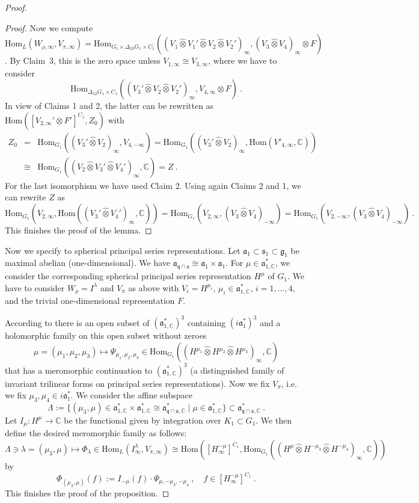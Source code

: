 \documentclass[10]{amsart}
\theoremstyle{remark}
\theoremstyle{definition}
\numberwithin{equation}{section}
\newcommand{\C}{\mathbb{C}}           %
\newcommand{\Hom}{\mathrm{Hom}}
\newcommand{\fa}{{\mathfrak a}}             %
\newcommand{\fg}{{\mathfrak g}}
\newcommand{\fq}{{\mathfrak q}}
\newcommand{\fs}{{\mathfrak s}}
\begin{document}
{\begin{proof}
\begin{proof}
Now we compute $\Hom_L(W_{\rho,\infty},V_{\pi,\infty})=\Hom_{G_1\times\Delta_{23}G_1\times C_1}((V_1\hat\otimes V_1'\hat\otimes V_2\hat\otimes V_2')_\infty ,(V_3\hat \otimes V_4)_\infty\otimes F )$. By Claim~3, this is the zero space unless $V_{1,\infty}\cong V_{3,\infty}$, where we have to consider
$$ \Hom_{\Delta_{12}G_1\times C_1}(( V_3'\hat\otimes V_2\hat\otimes V_2')_\infty ,V_{4,\infty}\otimes F )\ .$$
In view of Claims 1 and 2, the latter can be rewritten as $\Hom( [V_{2,\infty}'\otimes F']^{C_1}, Z_0)$ with
\begin{eqnarray*}  Z_0&=& \Hom_{G_1}(( V_3'\hat\otimes V_2)_\infty, V_{4,-\infty})= \Hom_{G_1}(( V_3'\hat\otimes V_2)_\infty,\Hom(V'_{4,\infty},\C))\\
&\cong& \Hom_{G_1}( (V_2\hat\otimes V_3'\hat\otimes V_4')_\infty,\C)=Z\ .
\end{eqnarray*}
For the last isomorphism we have used Claim 2. Using again Claims 2 and 1, we can rewrite $Z$ as
$$  \Hom_{G_1}( V_{2,\infty}, \Hom(( V_3'\hat\otimes V_4')_\infty,\C))= \Hom_{G_1}( V_{2,\infty}, ( V_3\hat\otimes V_4)_{-\infty})
= \Hom_{G_1}( V_{2,-\infty},( V_3\hat\otimes V_4)_{-\infty})\ .$$
This finishes the proof of the lemma.
\end{proof}
Now we specify to spherical principal series representations. Let $\fa_1\subset\fs_1\subset\fg_1$ be maximal abelian (one-dimensional). We have $\fa_{\fq\cap\fs}\cong \fa_1\times\fa_1$. For $\mu\in\fa_{1,\C}^*$, we consider the corresponding spherical principal series representation $H^\mu$ of $G_1$. We have to consider $W_\rho=I^\lambda$ and
$V_\pi$ as above with $V_i=H^{\mu_i}$, $\mu_i\in \fa_{1,\C}^*$, $i=1,\dots,4$,  and the trivial one-dimensional representation $F$. 
 
According to \cite{BSKZ14} there is an open subset of $(\fa_{1,\C}^*)^3$ containing $(i\fa_{1}^*)^3$ and a holomorphic family on this open subset without zeroes 
$$  \mu=(\mu_1,\mu_2,\mu_3)\mapsto \Psi_{\mu_1,\mu_2,\mu_3}\in \Hom_{G_1}( (H^{\mu_1}\hat\otimes H^{\mu_2}\hat\otimes H^{\mu_3})_\infty,\C) $$
that has a meromorphic continuation to $(\fa_{1,\C}^*)^3$ (a distinguished family of invariant trilinear forms on principal series representations). Now we fix $V_\pi$, i.e. we fix $\mu_3, \mu_4\in i\fa_{1}^*$. We consider the affine subspace 
$$ \Lambda:= \{(\mu_3,\mu)\in \fa_{1,\C}^*\times \fa_{1,\C}^*\cong  \fa_{\fq\cap\fs,\C}^*\mid \mu\in \fa_{1,\C}^*\}\subset \fa_{\fq\cap\fs,\C}^*\ .$$
Let $I_\mu: H^\mu\rightarrow \C$ be the functional given by integration over $K_1\subset G_1$. We then define the desired meromorphic family as follows:
$$ \Lambda\ni \lambda= (\mu_3,\mu)\mapsto \Phi_{\lambda}\in \Hom_L(I^\lambda_\infty, V_{\pi,\infty})\cong \Hom ([H^{-\mu}_\infty]^{C_1}, \Hom_{G_1}((H^\mu\hat\otimes H^{-\mu_3}\hat\otimes H^{-\mu_4})_\infty,\C))$$
by
$$  \Phi_{(\mu_3,\mu)}(f):= I_{-\mu}(f)\cdot \Psi_{\mu,-\mu_3,-\mu_4}\ ,\quad f\in [H^{-\mu}_\infty]^{C_1}\ .$$
This finishes the proof of the proposition.
\end{proof}



}
\end{document}
